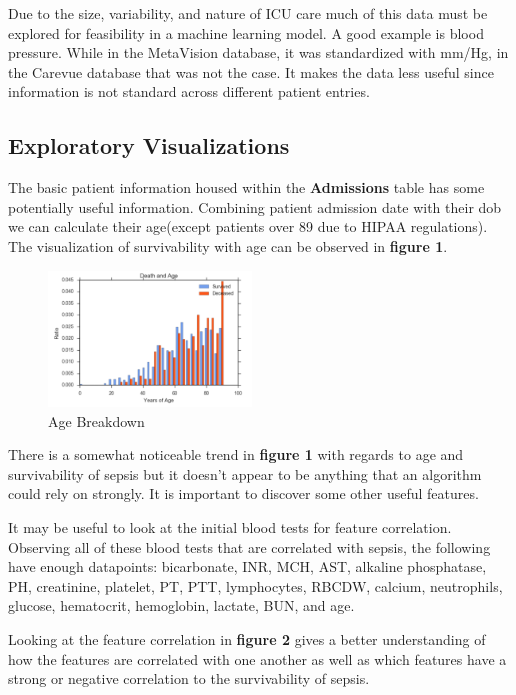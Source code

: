 \documentclass[11pt]{article}
\begin{document}
	Due to the size, variability, and nature of ICU care much of this data must be explored for feasibility in a machine learning model. A good example is blood pressure. While in the MetaVision database, it was standardized with mm/Hg, in the Carevue database that was not the case. It makes the data less useful since information is not standard across different patient entries.
	
	\subsection{Exploratory Visualizations}
	The basic patient information housed within the \textbf{Admissions} table has some potentially useful information. Combining patient admission date with their dob we can calculate their age(except patients over 89 due to HIPAA regulations). The visualization of survivability with age can be observed in \textbf{figure 1}.
	
	\begin{figure}
		\begin{center}
			\includegraphics[width=0.48\textwidth]{age.png}
		\end{center}
		\caption{Age Breakdown}
	\end{figure}
	
	There is a somewhat noticeable trend in \textbf{figure 1} with regards to age and survivability of sepsis but it doesn't appear to be anything that an algorithm could rely on strongly. It is important to discover some other useful features.
	
	It may be useful to look at the initial blood tests for feature correlation. Observing all of these blood tests that are correlated with sepsis, the following have enough datapoints: bicarbonate, INR, MCH, AST, alkaline phosphatase, PH, creatinine, platelet, PT, PTT, lymphocytes, RBCDW, calcium, neutrophils, glucose, hematocrit, hemoglobin, lactate, BUN, and age.
	
	Looking at the feature correlation in \textbf{figure 2} gives a better understanding of how the features are correlated with one another as well as which features have a strong or negative correlation to the survivability of sepsis.
	
\end{document}
